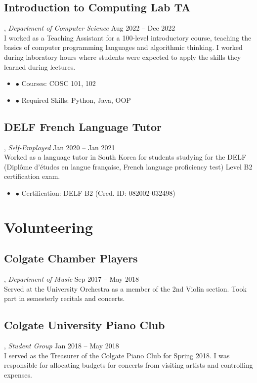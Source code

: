 \documentclass[11pt, letterpaper]{article}
\newenvironment{nitemize}{%
  \begin{itemize}[label={},topsep=0pt,itemsep=0pt,parsep=0pt,leftmargin=*]%
}{%
  \end{itemize}%
}
\begin{document}
\subsection{Introduction to Computing Lab TA}, \emph{Department of Computer Science} \hfill Aug 2022 – Dec 2022\\
I worked as a Teaching Assistant for a 100-level introductory course, teaching the basics of computer programming languages and algorithmic thinking. I worked during laboratory hours where students were expected to apply the skills they learned during lectures.
\begin{nitemize}
    \item \(\bullet\) Courses: COSC 101, 102
    \item \(\bullet\) Required Skills: Python, Java, OOP
\end{nitemize}

\subsection{DELF French Language Tutor}, \emph{Self-Employed} \hfill Jan 2020 – Jan 2021\\
Worked as a language tutor in South Korea for students studying for the DELF (Diplôme d’études en langue française, French language proficiency test) Level B2 certification exam.
\begin{nitemize}
    \item \(\bullet\) Certification: DELF B2 (Cred. ID: 082002-032498)
\end{nitemize}

\section{Volunteering}
\subsection{Colgate Chamber Players}, \emph{Department of Music} \hfill Sep 2017 – May 2018\\
\noindent Served at the University Orchestra as a member of the 2nd Violin section. Took part in semesterly recitals and concerts.

\subsection{Colgate University Piano Club}, \emph{Student Group} \hfill Jan 2018 – May 2018\\
I served as the Treasurer of the Colgate Piano Club for Spring 2018. I was responsible for allocating budgets for concerts from visiting artists and controlling expenses.
\end{document}
